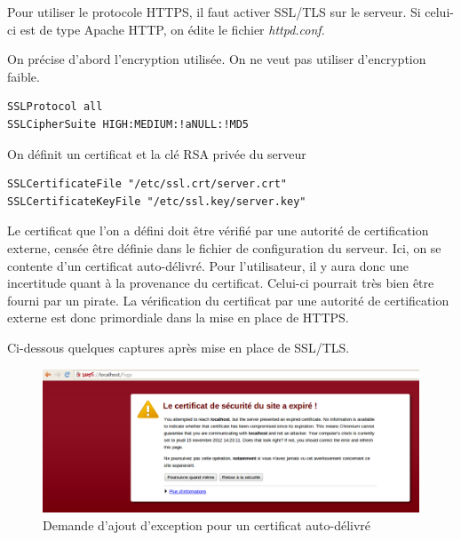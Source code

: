 \documentclass[a4paper]{article}
\begin{document}
Pour utiliser le protocole HTTPS, il faut activer SSL/TLS sur le serveur.
Si celui-ci est de type Apache HTTP, on édite le fichier \textit{httpd.conf}. 

On précise d'abord l'encryption utilisée. On ne veut pas utiliser d'encryption faible.
\begin{verbatim}
SSLProtocol all
SSLCipherSuite HIGH:MEDIUM:!aNULL:!MD5
\end{verbatim}

On définit un certificat et la clé RSA privée du serveur
\begin{verbatim}
SSLCertificateFile "/etc/ssl.crt/server.crt"
SSLCertificateKeyFile "/etc/ssl.key/server.key"
\end{verbatim}

Le certificat que l'on a défini doit être vérifié par une autorité
de certification externe, censée être définie dans le fichier de configuration du serveur.
Ici, on se contente d'un certificat auto-délivré.
Pour l'utilisateur, il y aura donc une incertitude quant à la provenance du certificat.
Celui-ci pourrait très bien être fourni par un pirate.
La vérification du certificat par une autorité de certification externe est donc primordiale
dans la mise en place de HTTPS.

Ci-dessous quelques captures après mise en place de SSL/TLS.

\begin{figure}[!ht]
	\centering
	\includegraphics[scale=0.4]{HTTPS.png}
	\caption{\label{certif1} Demande d'ajout d'exception pour un certificat auto-délivré}
\end{figure}
\end{document}

